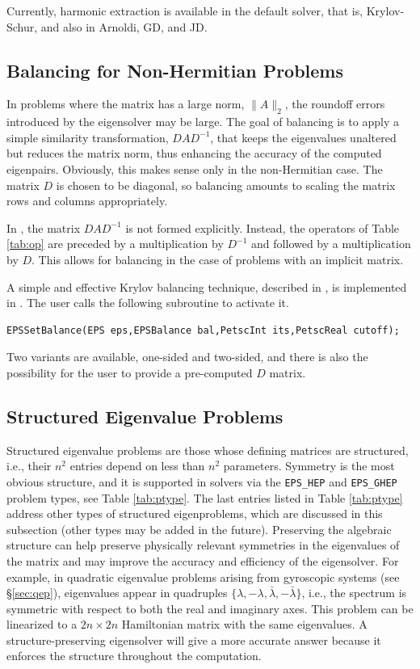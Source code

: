 Currently, harmonic extraction is available in the default  solver, that is, Krylov-Schur, and also in Arnoldi, GD, and JD.

\subsection{Balancing for Non-Hermitian Problems}
\label{sec:balancing}

In problems where the matrix has a large norm, $\|A\|_2$, the roundoff errors introduced by the eigensolver may be large. The goal of balancing is to apply a simple similarity transformation, $DAD^{-1}$, that keeps the eigenvalues unaltered but reduces the matrix norm, thus enhancing the accuracy of the computed eigenpairs. Obviously, this makes sense only in the non-Hermitian case. The matrix $D$ is chosen to be diagonal, so balancing amounts to scaling the matrix rows and columns appropriately.

In \slepc, the matrix $DAD^{-1}$ is not formed explicitly. Instead, the operators of Table \ref{tab:op} are preceded by a multiplication by $D^{-1}$ and followed by a multiplication by $D$. This allows for balancing in the case of problems with an implicit matrix.

A simple and effective Krylov balancing technique, described in \citep{Chen:2000:BSM}, is implemented in \slepc. The user calls the following subroutine to activate it.
        \begin{Verbatim}[fontsize=\small]
        EPSSetBalance(EPS eps,EPSBalance bal,PetscInt its,PetscReal cutoff);
        \end{Verbatim}
Two variants are available, one-sided and two-sided, and there is also the possibility for the user to provide a pre-computed $D$ matrix.

\subsection{Structured Eigenvalue Problems}
\label{sec:structured}

Structured eigenvalue problems are those whose defining matrices are structured, i.e., their $n^2$ entries depend on less than $n^2$ parameters. Symmetry is the most obvious structure, and it is supported in \slepc solvers via the \texttt{EPS\_HEP} and \texttt{EPS\_GHEP} problem types, see Table \ref{tab:ptype}. The last entries listed in Table \ref{tab:ptype} address other types of structured eigenproblems, which are discussed in this subsection (other types may be added in the future). Preserving the algebraic structure can help preserve physically relevant symmetries in the eigenvalues of the matrix and may improve the accuracy and efficiency of the eigensolver. For example, in quadratic eigenvalue problems arising from gyroscopic systems (see \S\ref{sec:qep}), eigenvalues appear in quadruples $\{\lambda,-\lambda,\bar\lambda,-\bar\lambda\}$, i.e., the spectrum is symmetric with respect to both the real and imaginary axes. This problem can be linearized to a $2n\times 2n$ Hamiltonian matrix with the same eigenvalues. A structure-preserving eigensolver will give a more accurate answer because it enforces the structure throughout the computation.

